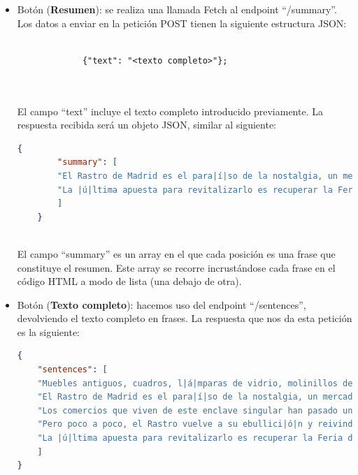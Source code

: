 \begin{itemize}
	\item Botón (\textbf{Resumen}): se realiza una llamada Fetch al endpoint ``/summary''. Los datos a enviar en la petición POST  tienen la siguiente estructura JSON:
		\begin{lstlisting}
		
	         {"text": "<texto completo>"};
	
		
	\end{lstlisting}
	El campo ``text'' incluye el texto completo introducido previamente. La respuesta recibida será un objeto JSON, similar al siguiente:

	
		\begin{lstlisting}[language=json, firstnumber=1]
	{
		"summary": [
		"El Rastro de Madrid es el para|í|so de la nostalgia, un mercadillo |ú|nico que la pandemia ha puesto en la cuerda floja.",
		"La |ú|ltima apuesta para revitalizarlo es recuperar la Feria de desembalajes en la plaza del General Vara de Rey, una tradici|ó|n que tuvo su origen en los a|ñ|os 70, y que ahora se asienta el primer y el tercer s|á|bado del mes para dinamizar las ventas y que no se encasillen en los cl|á|sicos domingos."
		]
	}
		
	\end{lstlisting}
	El campo ``summary'' es un array en el que cada posición es una frase que constituye el resumen. Este array se recorre incrustándose cada frase en el código HTML a modo de lista (una debajo de otra). 
	
 
	\item Botón (\textbf{Texto completo}): hacemos uso del endpoint ``/sentences'', devolviendo el texto completo en frases. La respuesta que nos da esta petición es la siguiente:
		\begin{lstlisting}[language=json, firstnumber=1]
{
	"sentences": [
	"Muebles antiguos, cuadros, l|á|mparas de vidrio, molinillos de caf|é|, porcelanas, vasijas, bustos y todo tipo de cachivaches.",
	"El Rastro de Madrid es el para|í|so de la nostalgia, un mercadillo |ú|nico que la pandemia ha puesto en la cuerda floja.",
	"Los comercios que viven de este enclave singular han pasado un a|ñ|o dif|í|cil, con bajos ingresos y muchas restricciones.",
	"Pero poco a poco, el Rastro vuelve a su ebullici|ó|n y reivindica la calle como un lugar de encuentro e intercambio.",
	"La |ú|ltima apuesta para revitalizarlo es recuperar la Feria de desembalajes en la plaza del General Vara de Rey, una tradici|ó|n que tuvo su origen en los a|ñ|os 70, y que ahora se asienta el primer y el tercer s|á|bado del mes para dinamizar las ventas y que no se encasillen en los cl|á|sicos domingos."
	]
}	
		\end{lstlisting}


\end{itemize}
